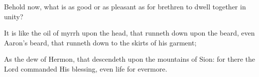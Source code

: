 Behold now, what is as good or as pleasant as for brethren to dwell together in unity?

It is like the oil of myrrh upon the head, that runneth down upon the beard, even Aaron’s beard, that runneth down to the skirts of his garment;

As the dew of Hermon, that descendeth upon the mountains of Sion: for there the Lord commanded His blessing, even life for evermore.
